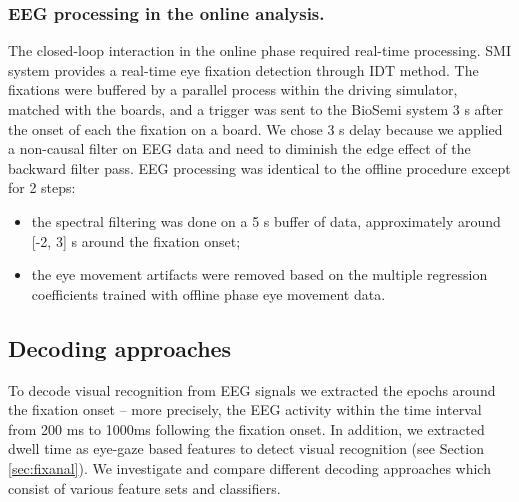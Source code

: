 \documentclass[12pt]{iopart}
\begin{document}
\subsubsection*{EEG processing in the online analysis.}
The closed-loop interaction in the online phase required real-time processing.
SMI system provides
a real-time eye fixation detection through IDT method. The fixations were buffered
by a parallel process within the driving simulator, matched with the boards,
and a trigger was sent to the BioSemi system 3 s after the onset of each the fixation
on a board. We chose 3 s delay because we applied a non-causal filter on EEG data
and need to diminish the edge effect of the backward filter pass.
EEG processing  was identical to the offline procedure
except for 2 steps:
\begin{itemize}
    \item the spectral filtering was done on a 5 s buffer of data,
        approximately around [-2, 3] s around the fixation onset;
    \item the eye movement artifacts were removed based on the multiple
        regression coefficients trained with offline phase eye movement data.
\end{itemize}

\subsection{Decoding approaches}
To decode visual recognition from EEG signals we extracted the epochs
around the fixation onset -- more precisely, the EEG activity within the time interval from
200 ms to 1000ms following the fixation onset.
In addition, we extracted dwell time as eye-gaze based features to detect
visual recognition (see Section \ref{sec:fixanal}).
We investigate and compare different decoding approaches which consist of 
various feature sets and classifiers.
\end{document}
